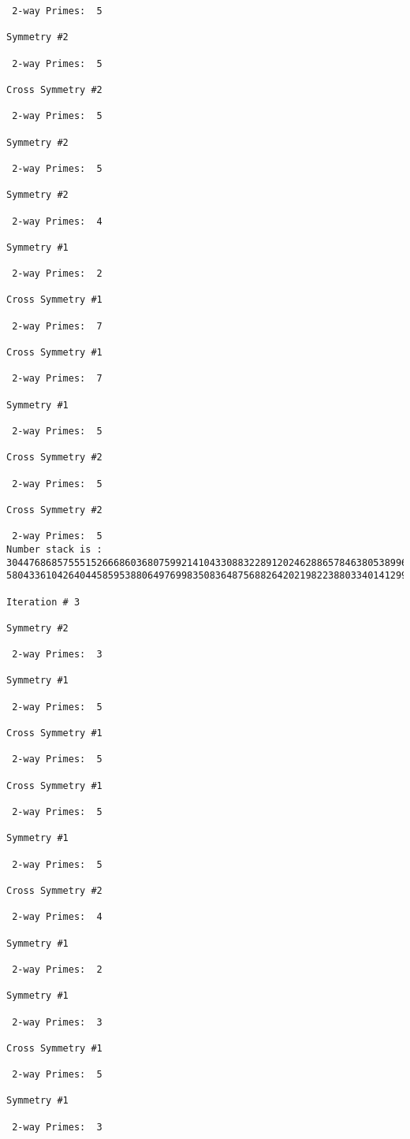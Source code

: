 \begin{verbatim}
 2-way Primes: 	5

Symmetry #2

 2-way Primes: 	5

Cross Symmetry #2

 2-way Primes: 	5

Symmetry #2

 2-way Primes: 	5

Symmetry #2

 2-way Primes: 	4

Symmetry #1

 2-way Primes: 	2

Cross Symmetry #1

 2-way Primes: 	7

Cross Symmetry #1

 2-way Primes: 	7

Symmetry #1

 2-way Primes: 	5

Cross Symmetry #2

 2-way Primes: 	5

Cross Symmetry #2

 2-way Primes: 	5
Number stack is :
30447686857555152666860368075992141043308832289120246288657846380538996794608835958544046240163340857
58043361042640445859538806497699835083648756882642021982238803340141299570863068666251555758686744037

Iteration #	3

Symmetry #2

 2-way Primes: 	3

Symmetry #1

 2-way Primes: 	5

Cross Symmetry #1

 2-way Primes: 	5

Cross Symmetry #1

 2-way Primes: 	5

Symmetry #1

 2-way Primes: 	5

Cross Symmetry #2

 2-way Primes: 	4

Symmetry #1

 2-way Primes: 	2

Symmetry #1

 2-way Primes: 	3

Cross Symmetry #1

 2-way Primes: 	5

Symmetry #1

 2-way Primes: 	3


\end{verbatim}
